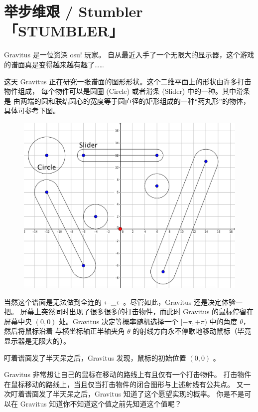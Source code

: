 \documentclass[UTF8, 11pt, a4paper]{article}
\begin{document}
\section*{举步维艰 / Stumbler \makebox[2.5em]{} \small{「STUMBLER」}}
Gravitus 是一位资深 osu! 玩家。%
自从最近入手了一个无限大的显示器，这个游戏的谱面真是变得越来越有趣了……

这天 Gravitus 正在研究一张谱面的图形形状。这个二维平面上的形状由许多打击物件组成，%
每个物件可以是圆圈 (Circle) 或者滑条 (Slider) 中的一种。其中滑条是%
由两端的圆和联结圆心的宽度等于圆直径的矩形组成的一种“药丸形”的物体，具体可参考下图。

\begin{figure}[h]\centering
\includegraphics[scale=0.22]{desc.png}
\end{figure}

当然这个谱面是无法做到全连的 ←\_←。尽管如此，Gravitus 还是决定体验一把。%
屏幕上突然同时出现了很多很多的打击物件，而此时 Gravitus 的鼠标停留在屏幕中央 $(0, 0)$ %
处。Gravitus 决定等概率随机选择一个 $[-\pi, +\pi)$ 中的角度 $\theta$，然后将鼠标沿着%
与横坐标轴正半轴夹角 $\theta$ 的射线方向永不停歇地移动鼠标（毕竟显示器是无限大的）。

盯着谱面发了半天呆之后，Gravitus 发现，鼠标的初始位置 $(0, 0)$%
  。

Gravitus 非常想让自己的鼠标在移动的路线上有且仅有一个打击物件。%
打击物件在鼠标移动的路线上，当且仅当打击物件的闭合图形与上述射线有公共点。%
又一次盯着谱面发了半天呆之后，Gravitus 知道了这个愿望实现的概率。%
你是不是可以在 Gravitus 知道你不知道这个值之前先知道这个值呢？
\end{document}
